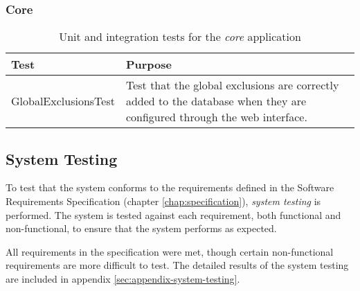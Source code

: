 \subsubsection{Core}

\begin{table}[H]
    \centering
    \begin{tabular}{ l  p{7cm} }
        \toprule
        Test                        & Purpose
        \\ \midrule
        GlobalExclusionsTest        & Test that the global exclusions are
                                      correctly added to the database when
                                      they are configured through the web
                                      interface.
        \\ \bottomrule
    \end{tabular}
    \caption{Unit and integration tests for the \emph{core} application}
    \label{tab:tests-core}
\end{table}

\subsection{System Testing}

To test that the system conforms to the requirements defined in the Software
Requirements Specification (chapter \ref{chap:specification}), \emph{system
testing} is performed. The system is tested against each requirement, both
functional and non-functional, to ensure that the system performs as expected.

All requirements in the specification were met, though certain non-functional
requirements are more difficult to test. The detailed results of the system
testing are included in appendix \ref{sec:appendix-system-testing}.
